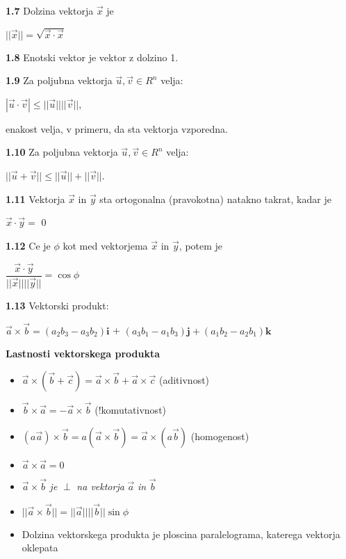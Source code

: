 \documentclass{article}
\begin{document}
\begin{multicols}{4}
	\textbf{1.7} Dolzina vektorja $\vec{x}$ je
	\begin{center}
		$||\vec{x}|| = \sqrt{\vec{x} \cdot \vec{x}}$
	\end{center}

	\textbf{1.8} Enotski vektor je vektor z dolzino 1.

	\textbf{1.9} Za poljubna vektorja $\vec{u}, \vec{v} \in R^{n}$ velja:
	\begin{center}
		$|\vec{u} \cdot \vec{v}| \leq ||\vec{u}||||\vec{v}||$,
	\end{center}
	enakost velja, v primeru, da sta vektorja vzporedna.


	\textbf{1.10} Za poljubna vektorja $\vec{u}, \vec{v} \in R^{n}$ velja:
	\begin{center}
		$||\vec{u} + \vec{v}|| \leq ||\vec{u}||+||\vec{v}||$.
	\end{center}

	\textbf{1.11} Vektorja $\vec{x}$ in $\vec{y}$ sta ortogonalna
	(pravokotna) natakno takrat, kadar je
	\begin{center}
		$\vec{x} \cdot \vec{y} = $ 0
	\end{center}

	\textbf{1.12} Ce je $\phi$ kot med vektorjema $\vec{x}$ in $\vec{y}$, potem je
	\begin{center}
		$\dfrac{\vec{x} \cdot \vec{y}}{||\vec{x}|| ||\vec{y}||} =
			\cos \phi$
	\end{center}

	\textbf{1.13} Vektorski produkt:
	\begin{center}
		$\vec{a} \times \vec{b} = (a_{2}b_{3} - a_{3}b_{2}) \textbf{i}$ +
		$(a_{3}b_{1} - a_{1}b_{3}) \textbf{j} + (a_{1}b_{2} - a_{2}b_{1}) \textbf{k}$
	\end{center}

	\textbf{Lastnosti vektorskega produkta}
	\begin{itemize}
		\item $\vec{a} \times (\vec{b} + \vec{c}) = \vec{a} \times \vec{b} + \vec{a} \times \vec{c}$ (aditivnost)
		\item $\vec{b} \times \vec{a} = -\vec{a} \times \vec{b}$ (!komutativnost)
		\item $ (a \vec{a}) \times \vec{b} = a(\vec{a} \times \vec{b}) =  \vec{a} \times (a \vec{b})$ (homogenost)
		\item $\vec{a} \times \vec{a} = 0$
		\item $\vec{a} \times \vec{b}$  \textit{je}  $\perp$ \textit{na vektorja} $\vec{a}$ \textit{in} $\vec{b}$
		\item $||\vec{a} \times \vec{b}|| = ||\vec{a}|| ||\vec{b}|| \sin \phi$
		\item Dolzina vektorskega produkta je ploscina paralelograma, katerega vektorja oklepata
	\end{itemize}


\end{multicols}
\end{document}
